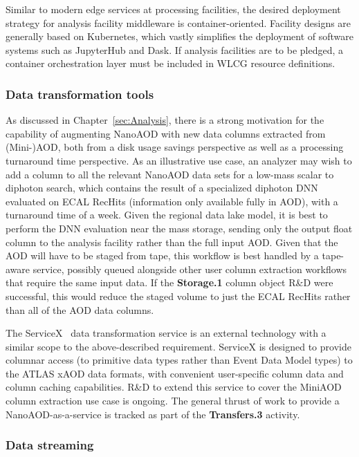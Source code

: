Similar to modern edge services at processing facilities, the desired deployment strategy for analysis facility middleware is container-oriented. Facility designs are generally based on Kubernetes, which vastly simplifies the deployment of software systems such as JupyterHub and Dask. If analysis facilities are to be pledged, a container orchestration layer must be included in \gls{WLCG} resource definitions.

\subsubsection{Data transformation tools}

As discussed in Chapter~\ref{sec:Analysis}, there is a strong motivation for the capability of augmenting NanoAOD with new data columns extracted from (Mini-)\gls{AOD}, both from a disk usage savings perspective as well as a processing turnaround time perspective. As an illustrative use case, an analyzer may wish to add a column to all the relevant NanoAOD data sets for a low-mass scalar to diphoton search, which contains the result of a specialized diphoton \gls{DNN} evaluated on \gls{ECAL} RecHits (information only available fully in \gls{AOD}), with a turnaround time of a week. Given the regional data lake model, it is best to perform the \gls{DNN} evaluation near the mass storage, sending only the output float column to the analysis facility rather than the full input \gls{AOD}. Given that the \gls{AOD} will have to be staged from tape, this workflow is best handled by a tape-aware service, possibly queued alongside other user column extraction workflows that require the same input data. If the \textbf{Storage.1} column object R\&D were successful, this would reduce the staged volume to just the \gls{ECAL} RecHits rather than all of the \gls{AOD} data columns.

The ServiceX~\cite{Galewsky:2020xig} data transformation service is an external technology with a similar scope to the above-described requirement. ServiceX is designed to provide columnar access (to primitive data types rather than Event Data Model types) to the ATLAS xAOD data formats, with convenient user-specific column data and column caching capabilities. R\&D to extend this service to cover the MiniAOD column extraction use case is ongoing. The general thrust of work to provide a NanoAOD-as-a-service is tracked as part of the \textbf{Transfers.3} activity.

\subsubsection{Data streaming}

